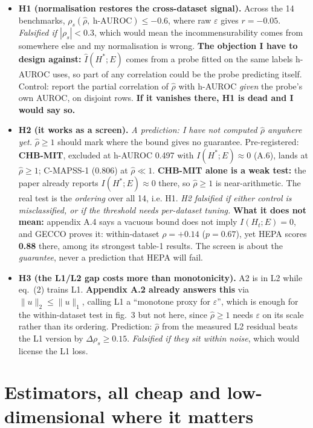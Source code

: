 \documentclass[9pt]{extarticle}
\newcommand{\hl}[1]{\textcolor{acc}{\textbf{#1}}}
\newcommand{\B}[1]{\textbf{#1}}
\begin{document}
\begin{itemize}
\item \hl{H1 (normalisation restores the cross-dataset signal).} Across the 14 benchmarks,
      $\rho_s(\hat\rho,\ \text{h-AUROC}) \le -0.6$, where raw $\varepsilon$ gives $r=-0.05$.
      \emph{Falsified if $|\rho_s| < 0.3$}, which would mean the incommensurability comes from somewhere else
      and my normalisation is wrong.
      \B{The objection I have to design against:} $\hat I(H^*;E)$ comes from a probe fitted on the same labels
      h-AUROC uses, so part of any correlation could be the probe predicting itself. Control: report the partial
      correlation of $\hat\rho$ with h-AUROC \emph{given} the probe's own AUROC, on disjoint rows.
      \hl{If it vanishes there, H1 is dead and I would say so.}
\item \hl{H2 (it works as a screen).} \emph{A prediction: I have not computed $\hat\rho$ anywhere yet.}
      $\hat\rho \ge 1$ should mark where the bound gives no guarantee. Pre-registered: \B{CHB-MIT}, excluded at
      h-AUROC 0.497 with $I(H^*;E)\approx 0$ (A.6), lands at $\hat\rho \ge 1$; C-MAPSS-1 (0.806) at
      $\hat\rho \ll 1$.
      \B{CHB-MIT alone is a weak test:} the paper already reports $I(H^*;E)\approx 0$ there, so $\hat\rho \ge 1$
      is near-arithmetic. The real test is the \emph{ordering} over all 14, i.e. H1.
      \emph{H2 falsified if either control is misclassified, or if the threshold needs per-dataset tuning.} \B{What it does not mean:} appendix A.4 says a vacuous bound
      does not imply $I(H_t;E)=0$, and GECCO proves it: within-dataset $\rho=+0.14$ ($p=0.67$), yet HEPA
      scores \B{0.88} there, among its strongest table-1 results. The screen is about the \emph{guarantee}, never
      a prediction that HEPA will fail.
\item \hl{H3 (the L1/L2 gap costs more than monotonicity).} A2 is in L2 while eq.~(2) trains L1.
      \B{Appendix A.2 already answers this} via $\|u\|_2\le\|u\|_1$, calling L1 a ``monotone proxy for
      $\varepsilon$'', which is enough for the within-dataset test in fig.~3 but not here, since $\hat\rho \ge 1$
      needs $\varepsilon$ on its scale rather than its ordering. Prediction: $\hat\rho$ from the measured L2
      residual beats the L1 version by $\Delta\rho_s \ge 0.15$. \emph{Falsified if they sit within noise},
      which would license the L1 loss.
\end{itemize}

\section{Estimators, all cheap and low-dimensional where it matters}
\end{document}
